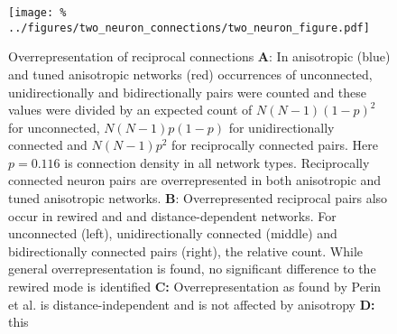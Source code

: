 

\begin{figure}[h]
  \texttt{[image: \%
    ../figures/two\_neuron\_connections/two\_neuron\_figure.pdf]} %
  \caption{Overrepresentation of reciprocal connections %
    \textbf{A}: In anisotropic (blue) and tuned anisotropic networks
    (red) occurrences of unconnected, unidirectionally and
    bidirectionally pairs were counted and these values were divided
    by an expected count of $N(N-1)(1-p)^2$ for unconnected,
    $N(N-1)p(1-p)$ for unidirectionally connected and $N(N-1)p^2$ for
    reciprocally connected pairs. Here $p=0.116$ is connection density
    in all network types. Reciprocally connected neuron pairs are
    overrepresented in both anisotropic and tuned anisotropic
    networks. %
    \textbf{B}: Overrepresented reciprocal pairs also occur in rewired
    and and distance-dependent networks. For unconnected (left),
    unidirectionally connected (middle) and bidirectionally connected
    pairs (right), the relative count. While general
    overrepresentation is found, no significant difference to the
    rewired mode is identified %
    \textbf{C:} Overrepresentation as found by Perin et al. is
    distance-independent and is not affected by anisotropy %
    \textbf{D:} this}
\label{fig:two_neuron}
\end{figure}



